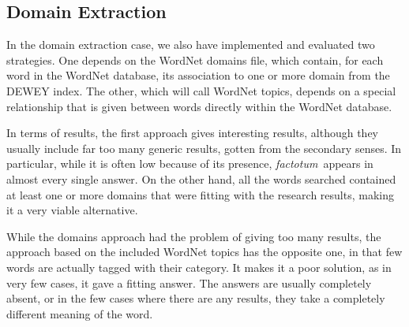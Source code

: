 
\subsection{Domain Extraction} %
\label{sub:domain_extraction}

In the domain extraction case, we also have implemented and evaluated two strategies. One depends on the WordNet domains file, which contain, for each word in the WordNet database, its association to one or more domain from the DEWEY index. The other, which will call WordNet topics, depends on a special relationship that is given between words  directly within the WordNet database.

In terms of results, the first approach gives interesting results, although they usually include far too many generic results, gotten from the secondary senses. In particular, while it is often low because of its presence, \emph{factotum}\ appears in almost every single answer. On the other hand, all the words searched contained at least one or more domains that were fitting with the research results, making it a very viable alternative.

While the domains approach had the problem of giving too many results, the approach based on the included WordNet topics has the opposite one, in that few words are actually tagged with their category. It makes it a poor solution, as in very few cases, it gave a fitting answer. The answers are usually completely absent, or in the few cases where there are any results, they take a completely different meaning of the word.




